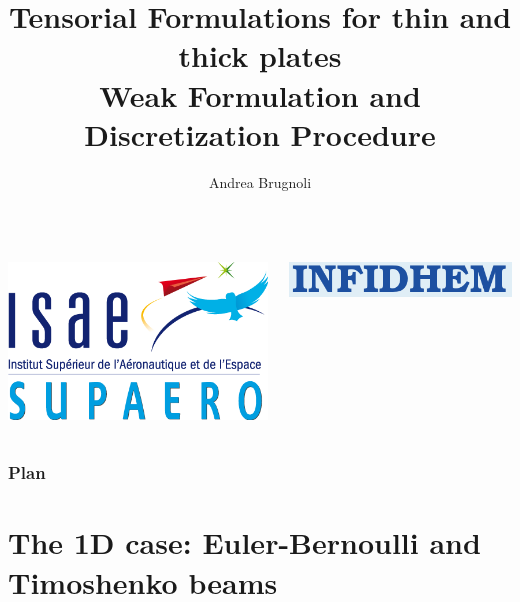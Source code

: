 \documentclass{beamer}
\title[INFIDHEM Workshop]{Tensorial Formulations for thin and thick plates \\ Weak Formulation and Discretization Procedure}
\author[A. Brugnoli ISAE-SUPAERO]{\small Andrea Brugnoli}
\begin{document}
	
\begin{frame}
	\titlepage
\begin{columns}
	\begin{column}{0.5\textwidth}
		\centering
		\includegraphics[height=0.2\textheight]{ISAE-SUPAERO.png}
	\end{column}
	\begin{column}{0.5\textwidth}
		\centering
		\includegraphics[scale=0.3]{infidhem.png}
	\end{column}
\end{columns}

\end{frame}

\begin{frame}
\frametitle{Plan}
\small
\tableofcontents
\normalsize
\end{frame}



\section{The 1D case: Euler-Bernoulli and Timoshenko beams}
\end{document}
